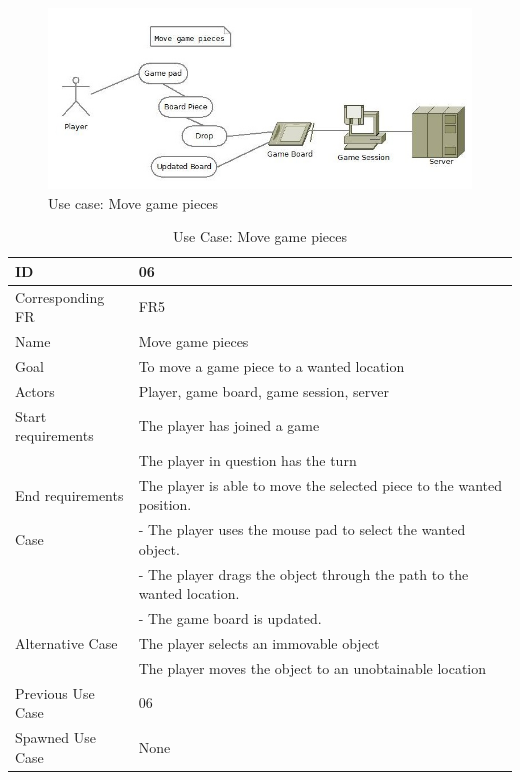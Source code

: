 \begin{figure}[H]
  \centering
    \includegraphics[width=1.0\textwidth]{img/movegamepieces.jpg}
  \caption{Use case: Move game pieces} 
  \label{fig:movepiece}
\end{figure}


\begin{table}[H]
\begin{tabular}{|l|p{14cm}|}
\hline
	\textbf{ID} & \textbf{06}\\ \hline
	Corresponding FR & FR5\\ \hline
	Name & Move game pieces \\ \hline
	Goal & To move a game piece to a wanted location \\ \hline
	Actors & Player, game board, game session, server \\ \hline
	Start requirements & The player has joined a game \\
				& The player in question has the turn \\ \hline
	End requirements & The player is able to move the selected piece to the wanted position. \\ \hline
	Case & - The player uses the mouse pad to select the wanted object. \\
		& - The player drags the object through the path to the wanted location. \\
		& - The game board is updated. \\ \hline
	Alternative Case & The player selects an immovable object \\
				& The player moves the object to an unobtainable location\\ \hline
	Previous Use Case & 06 \\ \hline
	Spawned Use Case & None\\ \hline
\end{tabular}
\caption{Use Case: Move game pieces}
\label{fig:usecase06table}
\end{table}


